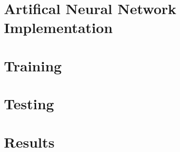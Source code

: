 \section{Artifical Neural Network Implementation}

\section{Training}

\section{Testing}

\section{Results}

